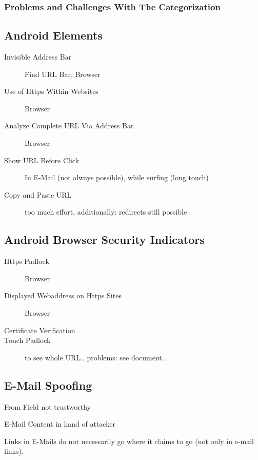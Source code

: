 \subsubsection{Problems and Challenges With The Categorization}

\subsection{Android Elements}

\begin{description}
	\item[Invisible Address Bar] Find URL Bar, Browser
	\item[Use of Https Within Websites] Browser
	\item[Analyze Complete URL Via Address Bar] Browser
	\item[Show URL Before Click] In E-Mail (not always possible), while surfing (long touch)
	\item[Copy and Paste URL] too much effort, additionally: redirects still possible
\end{description}

\subsection{Android Browser Security Indicators}

\begin{description}
		\item[Https Padlock] Browser
		\item[Displayed Webaddress on Https Sites] Browser
		\item[Certificate Verification]
		\item[Touch Padlock] to see whole URL.. problems: see document...
\end{description}

\subsection{E-Mail Spoofing}

\begin{description}
	\item{From Field} not trustworthy
	\item{E-Mail Content} in hand of attacker
	\item{Links in E-Mails} do not necessarily go where it claims to go (not only in e-mail links).
\end{description}
